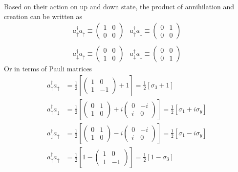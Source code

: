 \documentclass[../../../main.tex]{subfiles}
\begin{document}
Based on their action on up and down  state, the product of annihilation and creation can be written as
\begin{equation*}
    \begin{matrix}
        a_{\uparrow}^{\dagger} a_{\uparrow} \equiv \begin{pmatrix}1 & 0 \\ 0 & 0\end{pmatrix}
         &
        a_{\uparrow}^{\dagger} a_{\downarrow} \equiv \begin{pmatrix}0 & 1 \\ 0 & 0\end{pmatrix}
        \\\\
        a_{\downarrow}^{\dagger} a_{\uparrow} \equiv \begin{pmatrix}0 & 0 \\ 1 & 0\end{pmatrix}
         &
        a_{\downarrow}^{\dagger} a_{\downarrow} \equiv \begin{pmatrix}0 & 0 \\ 0 & 1\end{pmatrix}
    \end{matrix}
\end{equation*}
Or in terms of Pauli matrices
\begin{align*}
    a_{\uparrow}^{\dagger} a_{\uparrow}   & = \frac{1 }{2 }\left[ \begin{pmatrix}    1&0\\1&-1   \end{pmatrix} +1\right] = \frac{1 }{2 }\left[ \sigma_3+1 \right]                                                     \\
    a_{\uparrow}^{\dagger} a_{\downarrow} & = \frac{1 }{2 }\left[ \begin{pmatrix}    0&1\\1&0   \end{pmatrix} +i \begin{pmatrix}    0&-i\\i&0   \end{pmatrix}\right] = \frac{1 }{2 }\left[ \sigma_1+i\sigma_y \right] \\
    a_{\downarrow}^{\dagger} a_{\uparrow} & = \frac{1 }{2 }\left[ \begin{pmatrix}    0&1\\1&0   \end{pmatrix} -i \begin{pmatrix}    0&-i\\i&0   \end{pmatrix}\right] = \frac{1 }{2 }\left[ \sigma_1-i\sigma_y \right] \\
    a_{\uparrow}^{\dagger} a_{\uparrow}   & = \frac{1 }{2 }\left[ 1 - \begin{pmatrix}    1&0\\1&-1   \end{pmatrix}\right] = \frac{1 }{2 }\left[ 1 -\sigma_3 \right]
\end{align*}
\end{document}
